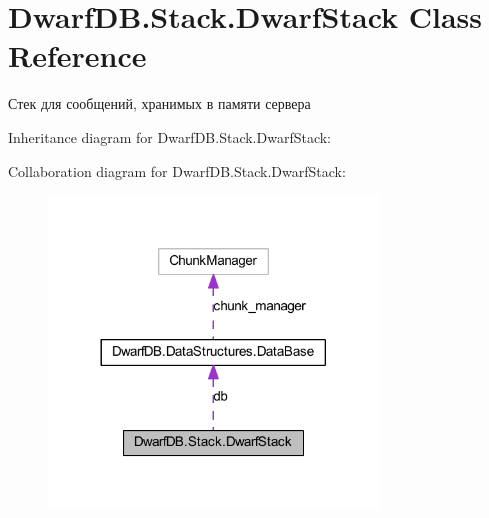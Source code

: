 \hypertarget{class_dwarf_d_b_1_1_stack_1_1_dwarf_stack}{\section{Dwarf\+D\+B.\+Stack.\+Dwarf\+Stack Class Reference}
\label{class_dwarf_d_b_1_1_stack_1_1_dwarf_stack}
}


Стек для сообщений, хранимых в памяти сервера  




Inheritance diagram for Dwarf\+D\+B.\+Stack.\+Dwarf\+Stack\+:


Collaboration diagram for Dwarf\+D\+B.\+Stack.\+Dwarf\+Stack\+:\nopagebreak
\begin{figure}[H]
\begin{center}
\leavevmode
\includegraphics[width=248pt]{class_dwarf_d_b_1_1_stack_1_1_dwarf_stack__coll__graph}
\end{center}
\end{figure}
